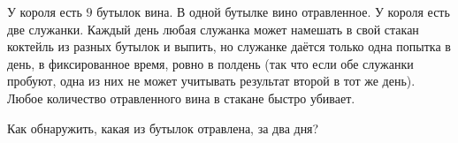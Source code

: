 У короля есть $9$ бутылок вина. В одной бутылке вино отравленное. У короля есть две служанки. Каждый день
любая служанка может намешать в свой стакан коктейль из разных бутылок и выпить, но служанке даётся
только одна попытка в день, в фиксированное время, ровно в полдень (так что если обе служанки пробуют,
одна из них не может учитывать результат второй в тот же день). Любое количество отравленного вина в
стакане быстро убивает.

Как обнаружить, какая из бутылок отравлена, за два дня?